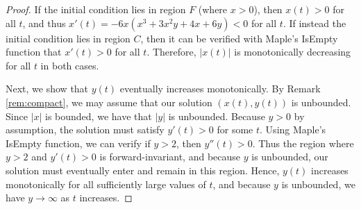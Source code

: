 \documentclass{amsart}
\numberwithin{equation}{section}
\theoremstyle{plain}
\theoremstyle{definition}
\theoremstyle{remark}
\numberwithin{table}{section}
\begin{document}
    \begin{proof}
        If the initial condition lies in region $F$ (where $x>0$), then $x(t)>0$ for all $t$, and thus $x'(t) = -6x\left(x^3 + 3x^2 y + 4x + 6y\right)<0$ for all $t$.
        If instead the initial condition lies in region $C$, then it can be verified with Maple's IsEmpty function that $x'(t)>0$ for all $t$.
        Therefore, $|x(t)|$ is monotonically decreasing for all $t$ in both cases.
        
        Next, we show that $y(t)$ eventually increases monotonically.
        By Remark \ref{rem:compact}, we may assume that our solution $(x(t),y(t))$ is unbounded.
        Since $|x|$ is bounded, we have that $|y|$ is unbounded.  
        Because $y>0$ by assumption, the solution must satisfy $y'(t) > 0$ for some $t$.  
        Using Maple's IsEmpty function, we can verify if $y>2$, then $y''(t)>0$.
        Thus the region where $y>2$ and $y'(t)>0$ is forward-invariant, and because $y$ is unbounded, our solution must eventually enter and remain in this region.
        Hence, $y(t)$ increases monotonically for all sufficiently large values of $t$, and because $y$ is unbounded, we have $y\to \infty$ as $t$ increases.
        
        




\end{proof}
\end{document}
